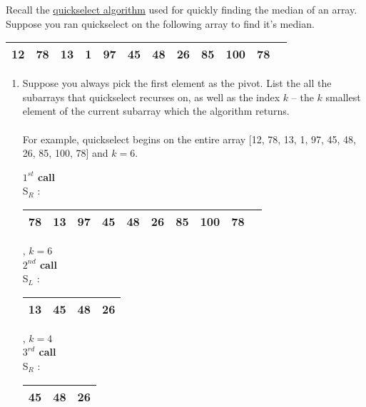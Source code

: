 \documentclass[11pt]{article}
\begin{document}
Recall the \href{https://people.eecs.berkeley.edu/~vazirani/algorithms/chap2.pdf#page=10}{quickselect algorithm} used for quickly finding the median of an array. Suppose you ran quickselect on the following array to find it's median.
\begin{center}
    \begin{tabular}{|c|c|c|c|c|c|c|c|c|c|c|c|}
        \hline
        12 & 78 & 13 & 1 & 97 & 45 & 48 & 26 & 85 & 100 & 78\\ 
        \hline
    \end{tabular}        
\end{center}
\begin{enumerate}

    \item Suppose you always pick the first element as the pivot. List the all the subarrays that quickselect recurses on, as well as the index $k$ -- the $k$ smallest element of the current subarray which the algorithm returns. \\ \\
    For example, quickselect begins on the entire array [12, 78, 13, 1, 97, 45, 48, 26, 85, 100, 78] and $k=6$.\\
    \begin{solution}
        \begin{center}
            \textbf{$1^{st}$ call}\\
            S$_R$ : 
            \begin{tabular}{|c|c|c|c|c|c|c|c|c|c|}
                \hline
                78 & 13 & 97 & 45 & 48 & 26 & 85 & 100 & 78\\ 
                \hline
            \end{tabular}
            , $k = 6$\\
            \textbf{$2^{nd}$ call}\\
            S$_L$ : 
            \begin{tabular}{|c|c|c|c|}
                \hline
                13 & 45 & 48 & 26\\ 
                \hline
            \end{tabular}
            , $k = 4$\\
            \textbf{$3^{rd}$ call}\\
            S$_R$ : 
            \begin{tabular}{|c|c|c|}
                \hline
                45 & 48 & 26\\ 
                \hline
            \end{tabular}

\end{center}
\end{solution}
\end{enumerate}
\end{document}
